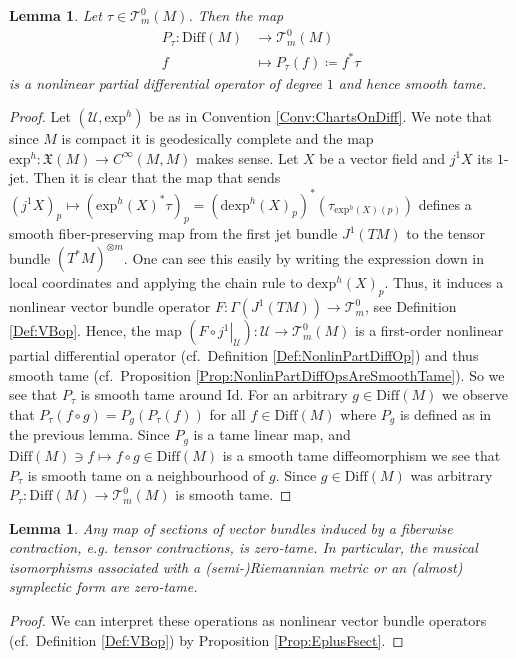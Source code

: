\documentclass[12pt,a4paper]{article}
\theoremstyle{plain}
\newtheorem{lemma}[theorem]{Lemma}
\theoremstyle{definition}
\newcommand{\tens}{\otimes}
\newcommand{\VFs}{\mathfrak{X}(M)}
\newcommand{\Diff}{\mathrm{Diff}(M)}
\newcommand{\eh}[1]{\mathrm{exp}^h(#1)}
\newcommand{\exh}{\mathrm{exp}^h}
\newcommand{\Id}{\mathrm{Id}}
\newcommand{\Ucal}{\mathcal{U}}
\newcommand{\tensf}[2]{\mathcal{T}^{#1}_{#2}(M)}
\renewcommand{\d}{\mathrm{d}}
\begin{document}
\begin{lemma}
\label{PullbackFixed_w}
Let $\tau\in \tensf{0}{m}$. Then the map 
\begin{align*}
    P_\tau:\Diff&\longrightarrow \tensf{0}{m}\\
    f&\longmapsto P_\tau(f)\coloneqq f^*\tau
\end{align*}
is a nonlinear partial differential operator of degree $1$ and hence smooth tame. 
\end{lemma}
\begin{proof}
Let $(\Ucal,\exh)$ be as in Convention \ref{Conv:ChartsOnDiff}. We note that since $M$ is compact it is geodesically complete and the map $\exh:\VFs \to C^\infty(M,M)$ makes sense.
Let $X$ be a vector field and $j^1X$ its $1$-jet. Then it is clear that the map that sends 
$(j^1X)_p\mapsto (\eh{X}^*\tau)_p=(\d\eh{X}_p)^*(\tau_{\eh{X}(p)})$ defines a smooth fiber-preserving map from the first jet bundle $J^1(TM)$ to the tensor bundle $(T^*M)^{\tens m}$. One can see this easily by writing the expression down in local coordinates and applying the chain rule to $\d\eh{X}_p$. Thus, it induces a nonlinear vector bundle operator $F:\Gamma(J^1(TM))\to \mathcal{T}^0_m$, see Definition \ref{Def:VBop}. Hence, the map $(F\circ \left.j^1\right|_\Ucal):\Ucal\to \tensf{0}{m}$ is a first-order nonlinear partial differential operator (cf.~Definition \ref{Def:NonlinPartDiffOp}) and thus smooth tame (cf.~Proposition \ref{Prop:NonlinPartDiffOpsAreSmoothTame}).
So we see that $P_\tau$ is smooth tame around $\Id$. For an arbitrary $g\in \Diff$ we observe that $P_\tau(f\circ g)=P_g(P_\tau(f))$ for all $f\in \Diff$ where $P_g$ is defined as in the previous lemma. Since $P_g$ is a tame linear map, and $\Diff \ni f\mapsto f\circ g\in \Diff$ is a smooth tame diffeomorphism we see that $P_\tau$ is smooth tame on a neighbourhood of $g$. Since $g\in \Diff$ was arbitrary $P_\tau:\Diff\to \tensf{0}{m}$ is smooth tame.
\end{proof}

\begin{lemma}
\label{IntProdSmTame}
Any map of sections of vector bundles induced by a fiberwise contraction, e.g. tensor contractions, is zero-tame. In particular, the musical isomorphisms associated with a (semi-)Riemannian metric or an (almost) symplectic form are zero-tame.
\end{lemma}
\begin{proof}
We can interpret these operations as nonlinear vector bundle operators (cf.~Definition \ref{Def:VBop}) by Proposition \ref{Prop:EplusFsect}.
\end{proof}
\end{document}
